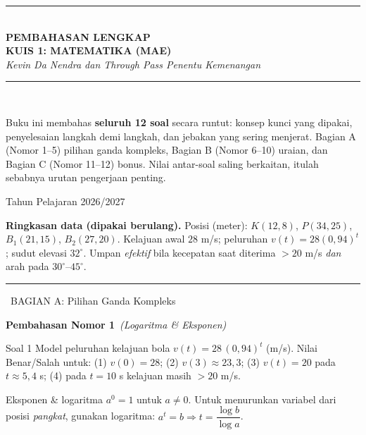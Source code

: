 \documentclass[11pt,a4paper]{article}
\newcommand{\bagianjudul}[1]{\par\bigskip\noindent%
  {\large\bfseries\color{ungu}\rule[-2pt]{4pt}{16pt}\ #1}\par\smallskip}
\newcommand{\nomorjudul}[2]{\par\bigskip\noindent%
  {\large\bfseries\color{ungu}Pembahasan Nomor #1}\ {\normalfont\itshape\color{gray}(#2)}\par\nopagebreak\smallskip}
\begin{document}
\thispagestyle{empty}
\begin{center}
\vspace*{1.5cm}
{\color{ungu}\rule{\textwidth}{2pt}}\\[0.5cm]
{\Huge\bfseries\color{ungu} PEMBAHASAN LENGKAP}\\[0.3cm]
{\LARGE\bfseries KUIS 1: MATEMATIKA (MAE)}\\[0.4cm]
{\large\itshape Kevin Da Nendra dan Through Pass Penentu Kemenangan}\\[0.3cm]
{\color{ungu}\rule{\textwidth}{2pt}}\\[1cm]

\begin{tcolorbox}[enhanced,width=0.9\textwidth,colback=ungumuda,colframe=ungu,arc=4pt,boxrule=1pt]
\centering\small
Buku ini membahas \textbf{seluruh 12 soal} secara runtut: konsep kunci yang
dipakai, penyelesaian langkah demi langkah, dan jebakan yang sering menjerat.
Bagian A (Nomor 1--5) pilihan ganda kompleks, Bagian B (Nomor 6--10) uraian,
dan Bagian C (Nomor 11--12) bonus. Nilai antar-soal saling berkaitan, itulah
sebabnya urutan pengerjaan penting.
\end{tcolorbox}

\vfill
{\large Tahun Pelajaran 2026/2027}
\end{center}
\clearpage

\begin{tips}
\textbf{Ringkasan data (dipakai berulang).}
Posisi (meter): $K(12,8)$, $P(34,25)$, $B_1(21,15)$, $B_2(27,20)$.
Kelajuan awal $28$ m/s; peluruhan $v(t)=28(0{,}94)^t$; sudut elevasi $32^\circ$.
Umpan \emph{efektif} bila kecepatan saat diterima $>20$ m/s \emph{dan} arah pada
$30^\circ$--$45^\circ$.
\end{tips}

\bagianjudul{BAGIAN A: Pilihan Ganda Kompleks}

\nomorjudul{1}{Logaritma \& Eksponen}
\begin{soalbox}{Soal 1}
Model peluruhan kelajuan bola $v(t)=28\,(0{,}94)^t$ (m/s). Nilai Benar/Salah untuk:
(1) $v(0)=28$; (2) $v(3)\approx23{,}3$; (3) $v(t)=20$ pada $t\approx5{,}4$ s;
(4) pada $t=10$ s kelajuan masih $>20$ m/s.
\end{soalbox}

\begin{ingat}{Eksponen \& logaritma}
$a^0=1$ untuk $a\neq0$. Untuk menurunkan variabel dari posisi \emph{pangkat},
gunakan logaritma: $a^t=b \Rightarrow t=\dfrac{\log b}{\log a}$.
\end{ingat}
\end{document}
